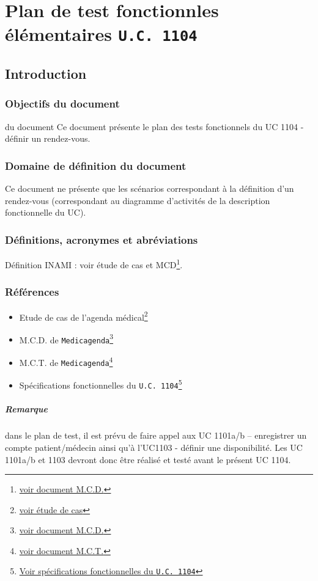 \documentclass[a4paper, 11pt]{report}
\begin{document}

\tableofcontents
\chapter{Plan de test fonctionnles élémentaires \texttt{U.C. 1104}}
\section{Introduction}
\subsection{Objectifs du document}
du document Ce document présente  le plan des tests fonctionnels du UC 1104 -
définir un rendez-vous. 
\subsection{Domaine de définition du document}
Ce document ne présente que les scénarios correspondant à la définition d’un
rendez-vous (correspondant au diagramme d’activités de la description fonctionnelle
du UC).
\subsection{Définitions, acronymes et abréviations}
Définition INAMI : voir étude de cas et MCD\footnote{\href{../MCD/MCD.pdf}{voir document M.C.D.}}.
\subsection{Références}
\begin{itemize}
	\item[] Etude de cas de l'agenda
		médical\footnote{\href{../Enonce_Travail_Synthese_14-15.pdf}{voir
		étude de cas}}
	\item[] M.C.D. de \texttt{Medicagenda}\footnote{\href{../MCD/MCD.pdf}{voir document M.C.D.}}
	\item[] M.C.T. de \texttt{Medicagenda}\footnote{\href{./MCT.pdf}{voir document M.C.T.}}
	\item[] Spécifications fonctionnelles du \texttt{U.C.
		1104}\footnote{\href{./specifications_fonctionnelles_UC_1104_definir_un_rendez-vous.pdf}{Voir
			spécifications fonctionnelles du \texttt{U.C. 1104}}}
	\end{itemize}

	\paragraph{Remarque}
	dans le plan de test, il est prévu de faire appel aux UC 1101a/b – enregistrer un compte
	patient/médecin ainsi qu’à l’UC1103 - définir une disponibilité. Les UC 1101a/b et 1103 devront
	donc être réalisé et testé avant le présent UC 1104.
\end{document}
